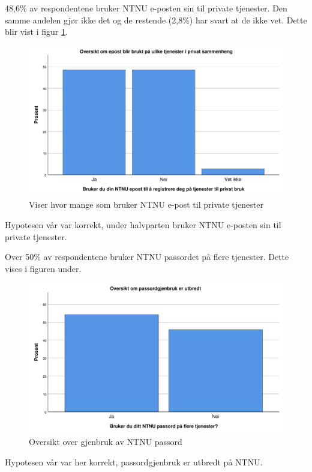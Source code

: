 48,6\% av respondentene bruker NTNU e-posten sin til private tjenester. Den samme andelen gjør ikke det og de restende (2,8\%) har svart at de ikke vet. Dette blir vist i figur \ref{fig:epost-privat}.
\begin{figure}[H]
    \centering
    \includegraphics[scale=0.5]{case_2/bilder/spss/epost_privat.pdf}
    \caption[epost-privat]{Viser hvor mange som bruker NTNU e-post til private tjenester}
    \label{fig:epost-privat}
\end{figure}
Hypotesen vår var korrekt, under halvparten bruker NTNU e-posten sin til private tjenester. 

Over 50\% av respondentene bruker NTNU passordet på flere tjenester. Dette vises i figuren under. 
\begin{figure}[H]
    \centering
    \includegraphics[scale=0.5]{case_2/bilder/spss/passordgjenbruk.pdf}
    \caption[passordgjenbruk]{Oversikt over gjenbruk av NTNU passord}
    \label{fig:passordgjenbruk}
\end{figure}
Hypotesen vår var her korrekt, passordgjenbruk er utbredt på NTNU. 

